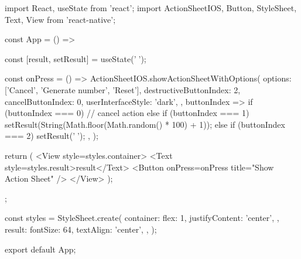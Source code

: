 
import React, {useState} from 'react';
import {ActionSheetIOS, Button, StyleSheet, Text, View} from 'react-native';

const App = () => {
  const [result, setResult] = useState('🔮');

  const onPress = () =>
    ActionSheetIOS.showActionSheetWithOptions(
      {
        options: ['Cancel', 'Generate number', 'Reset'],
        destructiveButtonIndex: 2,
        cancelButtonIndex: 0,
        userInterfaceStyle: 'dark',
      },
      buttonIndex => {
        if (buttonIndex === 0) {
          // cancel action
        } else if (buttonIndex === 1) {
          setResult(String(Math.floor(Math.random() * 100) + 1));
        } else if (buttonIndex === 2) {
          setResult('🔮');
        }
      },
    );

  return (
    <View style={styles.container}>
      <Text style={styles.result}>{result}</Text>
      <Button onPress={onPress} title="Show Action Sheet" />
    </View>
  );
};

const styles = StyleSheet.create({
  container: {
    flex: 1,
    justifyContent: 'center',
  },
  result: {
    fontSize: 64,
    textAlign: 'center',
  },
});

export default App;